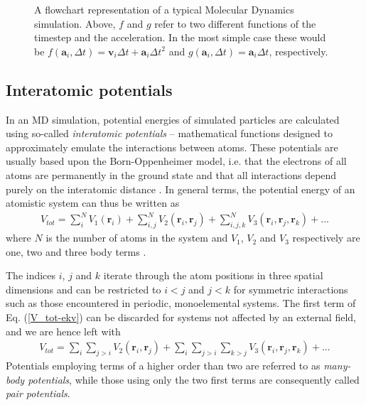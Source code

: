 \begin{figure}
\begin{center}
\endgroup
\caption{A flowchart representation of a typical Molecular Dynamics simulation. Above, $f$ and $g$ refer to two different functions of the timestep and the acceleration. In the most simple case these would be $f(\mathbf{a}_i,\Delta t) = \mathbf{v}_i\Delta t + \mathbf{a}_i\Delta t^2$ and $g(\mathbf{a}_i,\Delta t) = \mathbf{a}_i\Delta t$, respectively.} 
\label{MD-schema}
\end{center}
\end{figure}


\subsection{Interatomic potentials}

In an MD simulation, potential energies of simulated particles are calculated using so-called \textit{interatomic potentials} -- mathematical functions designed to approximately emulate the interactions between atoms. 
These potentials are usually based upon the Born-Oppenheimer model, i.e. that the electrons of all atoms are permanently in the ground state and that all interactions depend purely on the interatomic distance \cite{born1927quantentheorie}. 
In general terms, the potential energy of an atomistic system can thus be written as
\begin{align}
V_{tot} = \sum_i^N V_1(\mathbf{r}_i) + \sum_{i,j}^N V_2(\mathbf{r}_i, \mathbf{r}_j) +  \sum_{i,j,k}^N V_3(\mathbf{r}_i, \mathbf{r}_j, \mathbf{r}_k) + ...
\label{V_tot-ekv}
\end{align}
where $N$ is the number of atoms in the system and $V_1$, $V_2$ and $V_3$ respectively are one, two and three body terms \cite{potentialsTheory}.

The indices $i$, $j$ and $k$ iterate through the atom positions in three spatial dimensions and can be restricted to $i < j$ and $j < k$ for symmetric interactions such as those encountered in periodic, monoelemental systems. 
The first term of Eq. (\ref{V_tot-ekv}) can be discarded for systems not affected by an external field, and we are hence left with
\begin{align}
V_{tot} = \sum_i \sum_{j>i} V_2(\mathbf{r}_i, \mathbf{r}_j) + \sum_i \sum_{j>i} \sum_{k > j} V_3(\mathbf{r}_i, \mathbf{r}_j, \mathbf{r}_k) + ...
\end{align}
Potentials employing terms of a higher order than two are referred to as \textit{many-body potentials}, while those using only the two first terms are consequently called \textit{pair potentials}.

